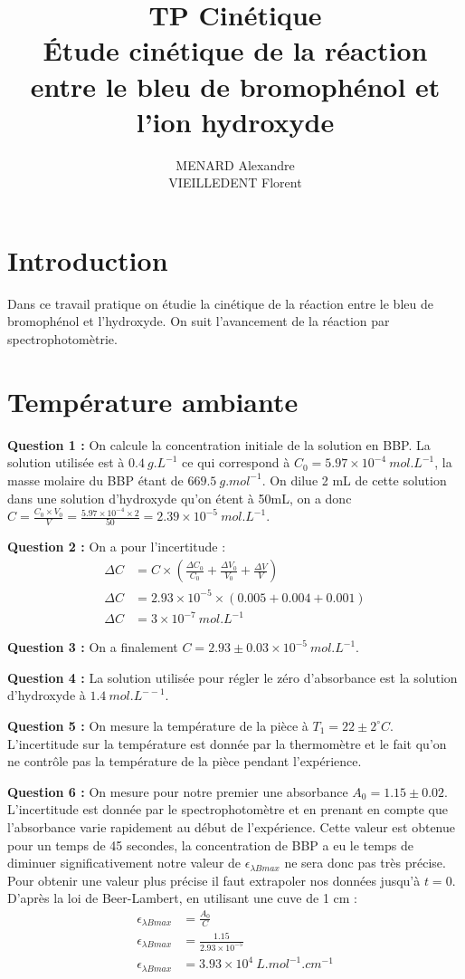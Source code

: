 \documentclass[12pt]{article}
\title{\textbf{TP Cinétique} \\Étude cinétique de la réaction entre le bleu de bromophénol et l'ion hydroxyde}
\author{MENARD Alexandre \\ VIEILLEDENT Florent}
\begin{document}
\maketitle

\section*{Introduction}
Dans ce travail pratique on étudie la cinétique de la réaction entre le bleu de bromophénol et l'hydroxyde.
On suit l'avancement de la réaction par spectrophotomètrie.

\section{Température ambiante}

\textbf{Question 1 :} On calcule la concentration initiale de la solution en BBP. 
La solution utilisée est à $0.4 \ g.L^{-1}$ ce qui correspond à $C_0=5.97\times 10^{-4} \ mol.L^{-1}$, la masse molaire du BBP étant de $669.5 \ g.mol^{-1}$.
On dilue 2 mL de cette solution dans une solution d'hydroxyde qu'on étent à 50mL, on a donc $C=\frac{C_0 \times V_0}{V}=\frac{5.97\times 10^{-4}\times 2}{50}=2.39\times 10^{-5}\ mol.L^{-1}$.

\textbf{Question 2 :} On a pour l'incertitude :
\begin{align*}
    \Delta C &= C \times \left( \frac{\Delta C_0}{C_0} + \frac{\Delta V_0}{V_0} + \frac{\Delta V}{V} \right) \\
    \Delta C &= 2.93\times 10^{-5} \times \left( 0.005 + 0.004 + 0.001 \right) \\
    \Delta C &= 3\times 10^{-7} \ mol.L^{-1}
\end{align*}

\textbf{Question 3 :} On a finalement $C= 2.93 \pm 0.03 \times 10^{-5}\ mol.L^{-1}$.

\textbf{Question 4 :} La solution utilisée pour régler le zéro d'absorbance est la solution d'hydroxyde à $1.4 \ mol.L^{--1}$.

\textbf{Question 5 :} On mesure la température de la pièce à $T_1 = 22 \pm 2 ^\circ C$. 
L'incertitude sur la température est donnée par la thermomètre et le fait qu'on ne contrôle pas la température de la pièce pendant l'expérience.

\textbf{Question 6 :} On mesure pour notre premier une absorbance $A_0=1.15\pm 0.02$. L'incertitude est donnée par le spectrophotomètre et en prenant en compte que l'absorbance varie rapidement au début de l'expérience.
Cette valeur est obtenue pour un temps de 45 secondes, la concentration de BBP a eu le temps de diminuer significativement notre valeur de $\epsilon_{\lambda Bmax}$ ne sera donc pas très précise.
Pour obtenir une valeur plus précise il faut extrapoler nos données jusqu'à $t=0$.
D'après la loi de Beer-Lambert, en utilisant une cuve de 1 cm :
\begin{align*}
    \epsilon_{\lambda Bmax} &= \frac{A_0}{C} \\
    \epsilon_{\lambda Bmax} &= \frac{1.15}{2.93\times 10^{-5}} \\
    \epsilon_{\lambda Bmax} &= 3.93 \times 10^4 \ L.mol^{-1}.cm^{-1}
\end{align*}
\end{document}
